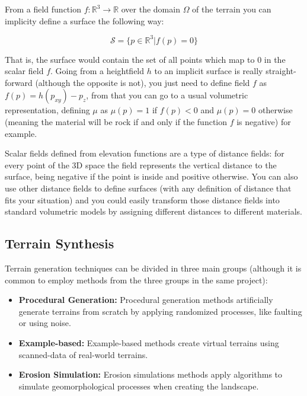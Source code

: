 From a field function $f: \mathbb{R}^3 \to \mathbb{R}$ over the domain $\Omega$
of the terrain you can implicity define a surface the following way:

\begin{equation}
\mathcal{S} = \{p \in \mathbb{R}^3 | f(p) = 0\}
\end{equation}

That is, the surface would contain the set of all points which map to 0 in the
scalar field $f$. Going from a heightfield $h$ to an implicit surface is really
straight-forward (although the opposite is not), you just need to define 
field $f$ as $f(p) = h(p_{xy}) - p_z$, from that you can go to a usual 
volumetric representation, defining $ \mu$ as $\mu(p) = 1$ if $f(p) < 0$
and $\mu(p) = 0$ otherwise  (meaning the material will be rock if 
and only if the function $f$ is negative) for example. 

\vspace{10pt}

Scalar fields defined from elevation functions are a type of distance fields: 
for every point of the 3D space the field represents the vertical distance 
to the surface, being negative if the point is inside and positive otherwise.
You can also use other distance fields to define surfaces (with any definition of distance 
that fits your situation) and you could easily transform those distance fields 
into standard volumetric models by assigning different distances to different 
materials.

\vspace{10pt}


\subsection{Terrain Synthesis}

Terrain generation techniques can be divided in three main groups (although
it is common to employ methods from the three groups in the same project):

\begin{itemize}
    \item \textbf{Procedural Generation:} Procedural generation methods 
    artificially generate terrains from scratch by applying randomized 
    processes, like faulting or using noise. 
    \item \textbf{Example-based:} Example-based methods create virtual 
    terrains using scanned-data of real-world terrains.
    \item \textbf{Erosion Simulation:} Erosion simulations methods apply
    algorithms to simulate geomorphological processes when creating the 
    landscape.
\end{itemize}

